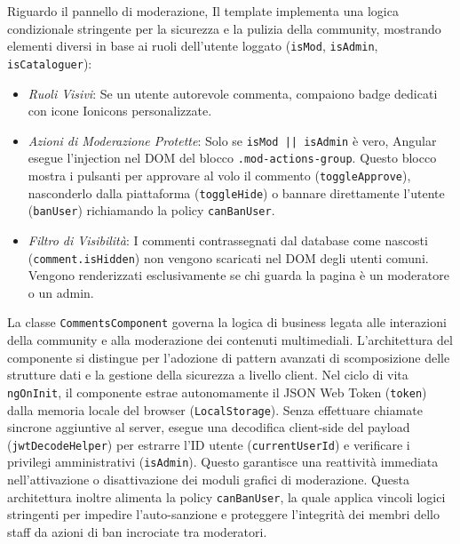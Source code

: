 \documentclass[11pt,a4paper]{article}
\begin{document}
\begin{itemize}
    Riguardo il pannello di moderazione, Il template implementa una logica condizionale stringente per la sicurezza e la pulizia della community, mostrando elementi diversi in base ai ruoli dell'utente loggato (\texttt{isMod}, \texttt{isAdmin}, \texttt{isCataloguer}):
    \begin{itemize}
        \item \textit{Ruoli Visivi}: Se un utente autorevole commenta, compaiono badge dedicati con icone Ionicons personalizzate.
        \item \textit{Azioni di Moderazione Protette}: Solo se \texttt{isMod || isAdmin} è vero, Angular esegue l'injection nel DOM del blocco \texttt{.mod-actions-group}. Questo blocco mostra i pulsanti per approvare al volo il commento (\texttt{toggleApprove}), nasconderlo dalla piattaforma (\texttt{toggleHide}) o bannare direttamente l'utente (\texttt{banUser}) richiamando la policy \texttt{canBanUser}.
        \item \textit{Filtro di Visibilità}: I commenti contrassegnati dal database come nascosti (\texttt{comment.isHidden}) non vengono scaricati nel DOM degli utenti comuni. Vengono renderizzati esclusivamente se chi guarda la pagina è un moderatore o un admin.
    \end{itemize}
    La classe \texttt{CommentsComponent} governa la logica di business legata alle interazioni della community e alla moderazione dei contenuti multimediali. L'architettura del componente si distingue per l'adozione di pattern avanzati di scomposizione delle strutture dati e la gestione della sicurezza a livello client.
    Nel ciclo di vita \texttt{ngOnInit}, il componente estrae autonomamente il JSON Web Token (\texttt{token}) dalla memoria locale del browser (\texttt{LocalStorage}). Senza effettuare chiamate sincrone aggiuntive al server, esegue una decodifica client-side del payload (\texttt{jwtDecodeHelper}) per estrarre l'ID utente (\texttt{currentUserId}) e verificare i privilegi amministrativi (\texttt{isAdmin}). Questo garantisce una reattività immediata nell'attivazione o disattivazione dei moduli grafici di moderazione. Questa architettura inoltre alimenta la policy \texttt{canBanUser}, la quale applica vincoli logici stringenti per impedire l'auto-sanzione e proteggere l'integrità dei membri dello staff da azioni di ban incrociate tra moderatori.
    

\end{itemize}
\end{document}
